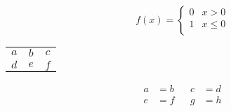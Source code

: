 \documentclass{minimal}
\begin{document}
  \begin{equation}
    f(x) =
    \begin{cases}
        0 & x>0\\
        1 & x\le 0\\
    \end{cases}
  \end{equation}

\begin{tabular}{ccc}
   $a$ & $b$ & $c$ \\
     $d$ & $e$ & $f$
  \end{tabular}

  \begin{align}
      a &= b && c &=d \\
      e &= f && g &=h
  \end{align}
\end{document}
